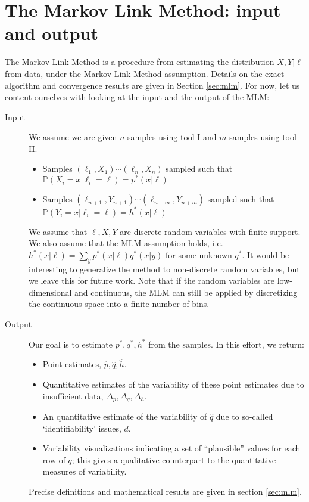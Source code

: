 \section{The Markov Link Method: input and output}

The Markov Link Method is a procedure from estimating the distribution $X,Y|\ell$ from data, under the Markov Link Method assumption.  Details on the exact algorithm and convergence results are given in Section \ref{sec:mlm}.  For now, let us content ourselves with looking at the input and the output of the MLM:

\begin{description}
    \item[Input] We assume we are given $n$ samples using tool I and $m$ samples using tool II.
    \begin{itemize}
        \item Samples $(\ell_1,X_1)\cdots (\ell_n,X_n)$ sampled such that $\mathbb{P}(X_i=x|\ell_i=\ell)= p^*(x|\ell)$
        \item Samples $(\ell_{n+1},Y_{n+1})\cdots (\ell_{n+m},Y_{n+m})$ sampled such that $\mathbb{P}(Y_i=x|\ell_i=\ell)= h^*(x|\ell)$
    \end{itemize}
    We assume that $\ell,X,Y$ are discrete random variables with finite support. We also assume that the MLM assumption holds, i.e.\ $h^*(x|\ell)=\sum_y p^*(x|\ell)q^*(x|y)$ for some unknown $q^*$.  It would be interesting to generalize the method to non-discrete random variables, but we leave this for future work.  Note that if the random variables are low-dimensional and continuous, the MLM can still be applied by discretizing the continuous space into a finite number of bins.
    \item[Output] Our goal is to estimate $p^*,q^*,h^*$ from the samples.  In this effort, we return:
    \begin{itemize}
        \item Point estimates, $\hat p,\hat q,\hat h$.  
        \item Quantitative estimates of the variability of these point estimates due to insufficient data, $\Delta_p,\Delta_q,\Delta_h$.  
        \item An quantitative estimate of the variability of $\hat q$ due to so-called `identifiability' issues, $\bar d$.  
        \item Variability visualizations indicating a set of ``plausible'' values for each row of $q$; this gives a qualitative counterpart to the quantitative measures of variability.
    \end{itemize}
    Precise definitions and mathematical results are given in section \ref{sec:mlm}.
\end{description}

